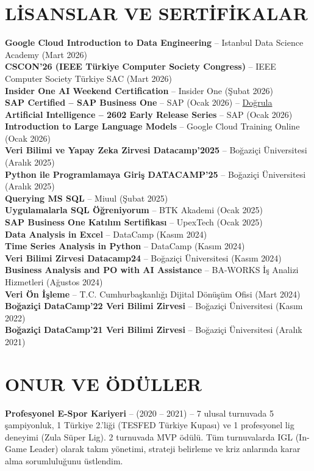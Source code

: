 \documentclass[a4paper,8pt]{article}
\begin{document}
\section{LİSANSLAR VE SERTİFİKALAR}
{\small
\textbf{Google Cloud Introduction to Data Engineering} -- Istanbul Data Science Academy (Mart 2026)\\
\textbf{CSCON'26 (IEEE Türkiye Computer Society Congress)} -- IEEE Computer Society Türkiye SAC (Mart 2026)\\
\textbf{Insider One AI Weekend Certification} -- Insider One (Şubat 2026)\\
\textbf{SAP Certified -- SAP Business One} -- SAP (Ocak 2026) -- \href{https://www.credly.com/badges/149da554-e1b6-477d-a063-f3c7997625c2/linked_in_profile}{Doğrula}\\
\textbf{Artificial Intelligence -- 2602 Early Release Series} -- SAP (Ocak 2026)\\
\textbf{Introduction to Large Language Models} -- Google Cloud Training Online (Ocak 2026)\\
\textbf{Veri Bilimi ve Yapay Zeka Zirvesi Datacamp'2025} -- Boğaziçi Üniversitesi (Aralık 2025)\\
\textbf{Python ile Programlamaya Giriş DATACAMP'25} -- Boğaziçi Üniversitesi (Aralık 2025)\\
\textbf{Querying MS SQL} -- Miuul (Şubat 2025)\\
\textbf{Uygulamalarla SQL Öğreniyorum} -- BTK Akademi (Ocak 2025)\\
\textbf{SAP Business One Katılım Sertifikası} -- UpexTech (Ocak 2025)\\
\textbf{Data Analysis in Excel} -- DataCamp (Kasım 2024)\\
\textbf{Time Series Analysis in Python} -- DataCamp (Kasım 2024)\\
\textbf{Veri Bilimi Zirvesi Datacamp24} -- Boğaziçi Üniversitesi (Kasım 2024)\\
\textbf{Business Analysis and PO with AI Assistance} -- BA-WORKS İş Analizi Hizmetleri (Ağustos 2024)\\
\textbf{Veri Ön İşleme} -- T.C. Cumhurbaşkanlığı Dijital Dönüşüm Ofisi (Mart 2024)\\
\textbf{Boğaziçi DataCamp'22 Veri Bilimi Zirvesi} -- Boğaziçi Üniversitesi (Kasım 2022)\\
\textbf{Boğaziçi DataCamp'21 Veri Bilimi Zirvesi} -- Boğaziçi Üniversitesi (Aralık 2021)
}

\section{ONUR VE ÖDÜLLER}
{\small
\textbf{Profesyonel E-Spor Kariyeri} -- (2020 -- 2021) -- 7 ulusal turnuvada 5 şampiyonluk, 1 Türkiye 2.'liği (TESFED Türkiye Kupası) ve 1 profesyonel lig deneyimi (Zula Süper Lig). 2 turnuvada MVP ödülü. Tüm turnuvalarda IGL (In-Game Leader) olarak takım yönetimi, strateji belirleme ve kriz anlarında karar alma sorumluluğunu üstlendim.
}
\end{document}
